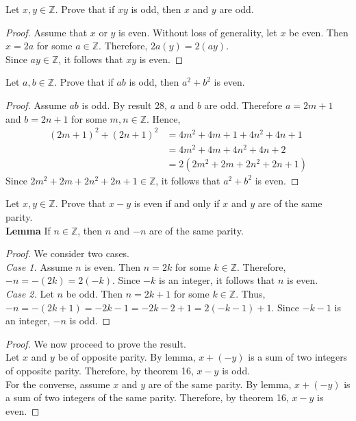 \documentclass[12pt]{article}
\newcommand{\Z}{\mathbb{Z}}
\newenvironment{problem}[2][Problem]{\begin{trivlist}
		\item[\hskip \labelsep {\bfseries #1}\hskip \labelsep {\bfseries #2.}]}{\end{trivlist}}
\begin{document}
\begin{problem}{28}
	Let $x,y\in \Z$. Prove that if $xy$ is odd, then $x$ and $y$ are odd.
	\begin{proof}
		Assume that $x$ or $y$ is even. Without loss of generality, let $x$ be even. Then $x=2a$ for some $a\in \Z$. Therefore,
			$2a(y) = 2(ay)$.\\
	Since $ay\in \Z$, it follows that $xy$ is even.
	\end{proof}
\end{problem}

\begin{problem}{29}
	Let $a,b \in \Z$. Prove that if $ab$ is odd, then $a^{2}+b^{2}$ is even.
	\begin{proof}
		Assume $ab$ is odd. By result 28, $a$ and $b$ are odd. Therefore $a=2m+1$ and $b=2n+1$ for some $m,n\in  \Z$. Hence,
		\begin{align*}
			(2m+1)^{2}+(2n+1)^{2}&=4m^{2}+4m+1+4n^{2}+4n+1\\
			&= 4m^{2}+4m+4n^{2}+4n+2\\
			&= 2(2m^{2}+2m+2n^{2}+2n+1)
		\end{align*}
	Since $2m^{2}+2m+2n^{2}+2n+1 \in \Z$, it follows that $a^{2}+b^{2}$ is even.
	\end{proof}
\end{problem}

\begin{problem}{30}
	Let $x,y\in \Z$. Prove that $x-y$ is even if and only if $x$ and $y$ are of the same parity.\\
	
		\textbf{Lemma} If $n\in \Z$, then $n$ and $-n$ are of the same parity.
		\begin{proof}
			We consider two cases.\\
			\textit{Case 1.} Assume $n$ is even. Then $n=2k$ for some $k\in \Z$. Therefore, $-n=-(2k)=2(-k)$.
			Since $-k$ is an integer, it follows that $n$ is even.\\
			\textit{Case 2.} Let $n$ be odd. Then $n=2k+1$ for some $k\in \Z$. Thus, $-n=-(2k+1)=-2k-1=-2k-2+1=2(-k-1)+1$. Since $-k-1$ is an integer, $-n$ is odd.
		\end{proof}
	\begin{proof}
		We now proceed to prove the result.\\
		Let $x$ and $y$ be of opposite parity. By lemma, $x+(-y)$ is a sum of two integers of opposite parity. Therefore, by theorem 16, $x-y$ is odd.\\
		For the converse, assume $x$ and $y$ are of the same parity. By lemma, $x+(-y)$ is a sum of two integers of the same parity. Therefore, by theorem 16, $x-y$ is even.
	\end{proof}
\end{problem}
\end{document}

